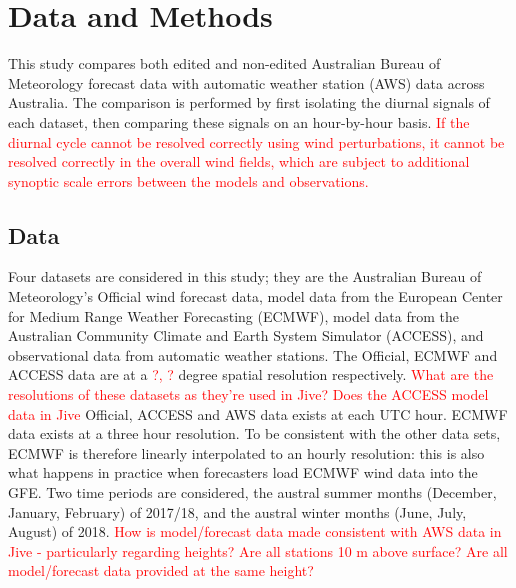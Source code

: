 \documentclass{ametsoc}
\begin{document}
\section{Data and Methods} \label{Sec:Methods}
This study compares both edited and non-edited Australian Bureau of Meteorology forecast data with automatic weather station (AWS) data across Australia. The comparison is performed by first isolating the diurnal signals of each dataset, then comparing these signals on an hour-by-hour basis. \textcolor{red}{If the diurnal cycle cannot be resolved correctly using wind perturbations, it cannot be resolved correctly in the overall wind fields, which are subject to additional synoptic scale errors between the models and observations.}

\subsection{Data} 
Four datasets are considered in this study; they are the Australian Bureau of Meteorology's Official wind forecast data, model data from the European Center for Medium Range Weather Forecasting (ECMWF), model data from the Australian Community Climate and Earth System Simulator (ACCESS), and observational data from automatic weather stations. The Official, ECMWF and ACCESS data are at a \textcolor{red}{?, ?} degree spatial resolution respectively. \textcolor{red}{What are the resolutions of these datasets as they're used in Jive? Does the ACCESS model data in Jive} Official, ACCESS and AWS data exists at each UTC hour. ECMWF data exists at a three hour resolution. To be consistent with the other data sets, ECMWF is therefore linearly interpolated to an hourly resolution: this is also what happens in practice when forecasters load ECMWF wind data into the GFE. Two time periods are considered, the austral summer months (December, January, February) of 2017/18, and the austral winter months (June, July, August) of 2018. \textcolor{red}{How is model/forecast data made consistent with AWS data in Jive - particularly regarding heights? Are all stations 10 m above surface? Are all model/forecast data provided at the same height?} 
\end{document}
